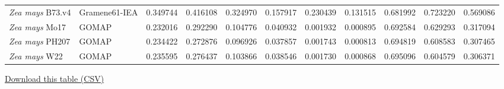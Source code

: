 \documentclass[utf8]{frontiersSCNS}
\begin{document}
\begin{table}[t]
{\begin{threeparttable}
\begin{tabular}{llrr>{}r|rr>{}r|rrr}
\multirow{-2}{*}{\raggedright\arraybackslash \textit{Zea mays} B73.v4} & Gramene61-IEA & 0.349744 & 0.416108 & 0.324970 & 0.157917 & 0.230439 & 0.131515 & 0.681992 & 0.723220 & 0.569086\\
\cmidrule{1-11}
\rowcolor{gray!6}  \textit{Zea mays} Mo17 & GOMAP & 0.232016 & 0.292290 & 0.104776 & 0.040932 & 0.001932 & 0.000895 & 0.692584 & 0.629293 & 0.317094\\
\cmidrule{1-11}
\textit{Zea mays} PH207 & GOMAP & 0.234422 & 0.272876 & 0.096926 & 0.037857 & 0.001743 & 0.000813 & 0.694819 & 0.608583 & 0.307465\\
\cmidrule{1-11}
\rowcolor{gray!6}  \textit{Zea mays} W22 & GOMAP & 0.235595 & 0.276437 & 0.103866 & 0.038546 & 0.001730 & 0.000868 & 0.695096 & 0.604579 & 0.306371\\
\bottomrule
\end{tabular}
\begin{tablenotes}
\item \href{https://raw.githubusercontent.com/Dill-PICL/GOMAP-Paper-2019.1/master/analyses/quality/results/quality_table.csv}{Download this table (CSV)}
\end{tablenotes}
\end{threeparttable}}
\end{table}


\end{document}
